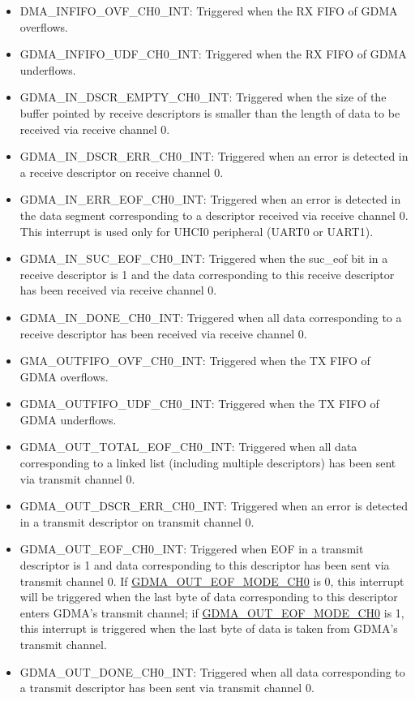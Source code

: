 \documentclass[main\_\_EN.tex]{subfiles}
\begin{document}
\begin{itemize}
\item \label{int:GDMAINFIFOOVFINT}DMA\_INFIFO\_OVF\_CH0\_INT: Triggered when the RX FIFO of GDMA overflows.
\item \label{int:GDMAINFIFOUDFINT}GDMA\_INFIFO\_UDF\_CH0\_INT: Triggered when the  RX FIFO of GDMA underflows.
\item \label{int:GDMAINDSCREMPTYINT}GDMA\_IN\_DSCR\_EMPTY\_CH0\_INT: Triggered when the size of the buffer pointed by receive descriptors is smaller than the length of data to be received via receive channel 0.
\item \label{int:GDMAINDSCRERRINT}GDMA\_IN\_DSCR\_ERR\_CH0\_INT: Triggered when an error is detected in a receive descriptor on receive channel 0.
\item \label{int:GDMAINERREOFINT}GDMA\_IN\_ERR\_EOF\_CH0\_INT: Triggered when an error is detected in the data segment corresponding to a descriptor received via receive channel 0. This interrupt is used only for UHCI0 peripheral (UART0 or UART1).
\item \label{int:GDMAINSUCEOFINT}GDMA\_IN\_SUC\_EOF\_CH0\_INT: Triggered when the suc\_eof bit in a receive descriptor is 1 and the data corresponding to this receive descriptor has been received via receive channel 0.
\item \label{int:GDMAINDONEINT}GDMA\_IN\_DONE\_CH0\_INT: Triggered when all data corresponding to a receive descriptor has been received via receive channel 0.
\item \label{int:GDMAOUTFIFOOVFINT}GMA\_OUTFIFO\_OVF\_CH0\_INT: Triggered when the TX FIFO of GDMA overflows.
\item \label{int:GDMAOUTFIFOUDFINT}GDMA\_OUTFIFO\_UDF\_CH0\_INT: Triggered when the TX FIFO of GDMA underflows.
\item \label{int:GDMAOUTTOTALEOFINT}GDMA\_OUT\_TOTAL\_EOF\_CH0\_INT: Triggered when all data corresponding to a linked list (including multiple descriptors) has been sent via transmit channel 0.
\item \label{int:GDMAOUTDSCRERRINT}GDMA\_OUT\_DSCR\_ERR\_CH0\_INT: Triggered when an error is detected in a transmit descriptor on transmit channel 0.
\item \label{int:GDMAOUTEOFINT}GDMA\_OUT\_EOF\_CH0\_INT: Triggered when EOF in a transmit descriptor is 1 and data corresponding to this descriptor has been sent via transmit channel 0. If \hyperref[fielddesc:GDMAOUTEOFMODECH0]{GDMA\_OUT\_EOF\_MODE\_CH0} is 0, this interrupt will be triggered when the last byte of data corresponding to this descriptor enters GDMA's transmit channel; if \hyperref[fielddesc:GDMAOUTEOFMODECH0]{GDMA\_OUT\_EOF\_MODE\_CH0} is 1, this interrupt is triggered when the last byte of data is taken from GDMA's transmit channel.
\item \label{int:GDMAOUTDONEINT}GDMA\_OUT\_DONE\_CH0\_INT: Triggered when all data corresponding to a transmit descriptor has been sent via transmit channel 0.
\end{itemize}
\end{document}
